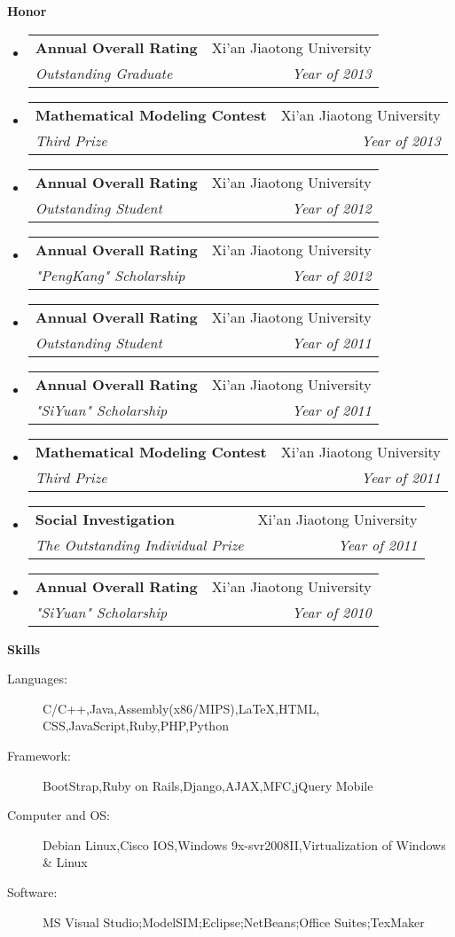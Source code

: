 \documentclass[letterpaper,11pt]{article}
\makeatletter
\newcommand{\resheading}[1]{{\large \colorbox{mygrey}{\begin{minipage}{\textwidth}{\textbf{#1 \vphantom{p\^{E}}}}\end{minipage}}}}
\newcommand{\ressubheading}[4]{
\begin{tabular*}{6.5in}{l@{\extracolsep{\fill}}r}
		\textbf{#1} & #2 \\
		\textit{#3} & \textit{#4} \\
\end{tabular*}\vspace{-6pt}}
\makeatother
\begin{document}
\resheading{Honor}
	\begin{itemize}
		\item
			\ressubheading{Annual Overall Rating}{Xi'an Jiaotong University}{Outstanding Graduate}{Year of 2013}
		\item
			\ressubheading{Mathematical Modeling Contest}{Xi'an Jiaotong University}{Third Prize}{Year of 2013}
		\item
			\ressubheading{Annual Overall Rating}{Xi'an Jiaotong University}{Outstanding Student}{Year of 2012}
		\item
			\ressubheading{Annual Overall Rating}{Xi'an Jiaotong University}{"PengKang" Scholarship}{Year of 2012}
		\item
			\ressubheading{Annual Overall Rating}{Xi'an Jiaotong University}{Outstanding Student}{Year of 2011}
		\item
			\ressubheading{Annual Overall Rating}{Xi'an Jiaotong University}{"SiYuan" Scholarship}{Year of 2011}
		\item
			\ressubheading{Mathematical Modeling Contest}{Xi'an Jiaotong University}{Third Prize}{Year of 2011}
		\item
			\ressubheading{Social Investigation}{Xi'an Jiaotong University}{The Outstanding Individual Prize}{Year of 2011}
		\item
			\ressubheading{Annual Overall Rating}{Xi'an Jiaotong University}{"SiYuan" Scholarship}{Year of 2010}
		\end{itemize}
	

	

\resheading{Skills}
	\begin{description}
		\item[Languages:] { \footnotesize C/C++,Java,Assembly(x86/MIPS),LaTeX,HTML, CSS,JavaScript,Ruby,PHP,Python}
		\item[Framework:] { \footnotesize BootStrap,Ruby on Rails,Django,AJAX,MFC,jQuery Mobile}
		\item[Computer and OS:] { \footnotesize Debian Linux,Cisco IOS,Windows 9x-svr2008II,Virtualization of Windows \& Linux}
		\item[Software:]{\footnotesize {MS Visual Studio};{ModelSIM};{Eclipse};{NetBeans};{Office Suites};{TexMaker}}  
	\end{description} %
\end{document}
